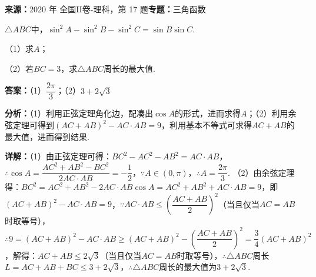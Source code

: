 \begin{question}[points=12]
\textbf{来源：}2020 年 全国II卷-理科，第 17 题\quad \textbf{专题：}三角函数\par
$\triangle ABC$中，$\sin^2A-\sin^2B-\sin^2C=\sin B\sin C$.

（1）求$A$；

（2）若$BC=3$，求$\triangle ABC$周长的最大值.
\begin{solution}
\textbf{答案：}（1）$\dfrac{2\pi}{3}$；（2）$3+2\sqrt3$

\textbf{分析：}（1）利用正弦定理角化边，配凑出$\cos A$的形式，进而求得$A$；（2）利用余弦定理可得到$(AC+AB)^2-AC\cdot AB=9$，利用基本不等式可求得$AC+AB$的最大值，进而得到结果.

\textbf{详解：}（1）由正弦定理可得：$BC^2-AC^2-AB^2=AC\cdot AB$，$\therefore\cos A=\dfrac{AC^2+AB^2-BC^2}{2AC\cdot AB}=-\dfrac12$，$\because A\in(0,\pi)$，$\therefore A=\dfrac{2\pi}{3}$.
（2）由余弦定理得：$BC^2=AC^2+AB^2-2AC\cdot AB\cos A=AC^2+AB^2+AC\cdot AB=9$，即$(AC+AB)^2-AC\cdot AB=9$，$\because AC\cdot AB\leq\left(\dfrac{AC+AB}{2}\right)^2$（当且仅当$AC=AB$时取等号），$\therefore9=(AC+AB)^2-AC\cdot AB\geq(AC+AB)^2-\left(\dfrac{AC+AB}{2}\right)^2=\dfrac34(AC+AB)^2$，解得：$AC+AB\leq2\sqrt3$（当且仅当$AC=AB$时取等号），$\therefore\triangle ABC$周长$L=AC+AB+BC\leq3+2\sqrt3$，$\therefore\triangle ABC$周长的最大值为$3+2\sqrt3$.
\end{solution}
\end{question}

